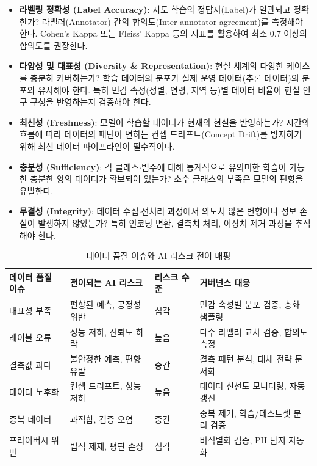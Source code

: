 \begin{itemize}
 \item \textbf{라벨링 정확성 (Label Accuracy)}: 지도 학습의 정답지(Label)가 일관되고 정확한가\cite{bender2018data}? 라벨러(Annotator) 간의 합의도(Inter-annotator agreement)를 측정해야 한다. Cohen's Kappa 또는 Fleiss' Kappa 등의 지표를 활용하여 최소 0.7 이상의 합의도를 권장한다.
 \item \textbf{다양성 및 대표성 (Diversity \& Representation)}: 현실 세계의 다양한 케이스를 충분히 커버하는가? 학습 데이터의 분포가 실제 운영 데이터\cite{ntoutsi2020bias}(추론 데이터)의 분포와 유사해야 한다. 특히 민감 속성(성별, 연령, 지역 등)별 데이터 비율이 현실 인구 구성을 반영하는지 검증해야 한다.
 \item \textbf{최신성 (Freshness)}: 모델이 학습할 데이터가 현재의 현실을 반영하는가? 시간의 흐름에 따라 데이터의 패턴이 변하는 컨셉 드리프트(Concept Drift)를 방지하기 위해 최신 데이터 파이프라인이 필수적이다.
 \item \textbf{충분성 (Sufficiency)}: 각 클래스$\cdot$범주에 대해 통계적으로 유의미한 학습이 가능한 충분한 양의 데이터가 확보되어 있는가? 소수 클래스의 부족은 모델의 편향을 유발한다.
 \item \textbf{무결성 (Integrity)}: 데이터 수집$\cdot$전처리 과정에서 의도치 않은 변형\cite{zook2017ten}이나 정보 손실이 발생하지 않았는가? 특히 인코딩 변환, 결측치 처리, 이상치 제거 과정을 추적해야 한다.
\end{itemize}

\begin{table}[htbp]
\centering
\caption{데이터 품질 이슈와 AI 리스크 전이 매핑}
\label{tab:quality_risk_mapping}
\begin{tabularx}{\textwidth}{p{2.5cm}p{3cm}p{2.5cm}X}
\toprule
\textbf{데이터 품질 이슈} & \textbf{전이되는 AI 리스크} & \textbf{리스크 수준} & \textbf{거버넌스 대응} \\
\midrule
대표성 부족 & 편향된 예측, 공정성 위반 & 심각 & 민감 속성별 분포 검증, 층화 샘플링 \\
\midrule
레이블 오류 & 성능 저하, 신뢰도 하락 & 높음 & 다수 라벨러 교차 검증, 합의도 측정 \\
\midrule
결측값 과다 & 불안정한 예측, 편향 유발 & 중간 & 결측 패턴 분석, 대체 전략 문서화 \\
\midrule
데이터 노후화 & 컨셉 드리프트, 성능 저하 & 높음 & 데이터 신선도 모니터링, 자동 갱신 \\
\midrule
중복 데이터 & 과적합, 검증 오염 & 중간 & 중복 제거, 학습/테스트셋 분리 검증 \\
\midrule
프라이버시 위반 & 법적 제재, 평판 손상 & 심각 & 비식별화 검증, PII 탐지 자동화 \\
\bottomrule
\end{tabularx}
\end{table}


